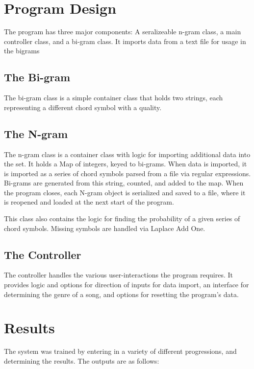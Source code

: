 ﻿\documentclass{article}
\begin{document}
\newpage

\section{Program Design}
The program has three major components:  A seralizeable n-gram class,
a main controller class, and a bi-gram class.  It imports data from a text 
file for usage in the bigrams %

	\subsection{The Bi-gram}
	The bi-gram class is a simple container class that holds two strings, each 
	representing a different chord symbol with a quality.


		\subsection{The N-gram}
		The n-gram class is a container class with logic for importing additional 
		data into the set.  It holds a Map of integers, keyed to bi-grams.  When 
		data is imported, it is imported as a series of chord symbols parsed 
		from a file via regular expressions.  Bi-grams are generated from this 
		string, counted, and added to the map.  When the program closes, each 
		N-gram object is serialized and saved to a file, where it is reopened and 
		loaded at the next start of the program.

		This class also contains the logic for finding the probability of a given 
		series of chord symbols.  Missing symbols are handled via Laplace Add One.

	\subsection{The Controller}
	The controller handles the various user-interactions the program requires.  
	It provides logic and options for direction of inputs for data import, an 
	interface for determining the genre of a song, and options for resetting 
	the program's data.

\newpage

\section{Results}

The system was trained by entering in a variety of different progressions,
and determining the results. The outputs are as follows:
\end{document}
